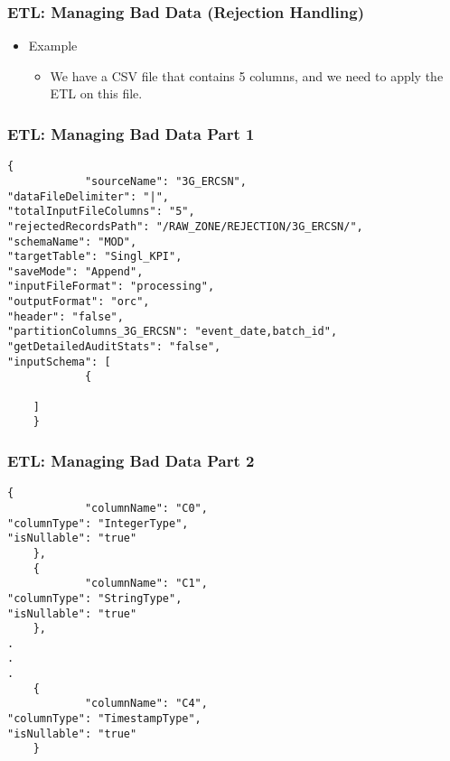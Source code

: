 \begin{frame}[fragile]
	\frametitle{ETL: Managing Bad Data (Rejection Handling)}

	\begin{itemize}[<+->]
		\item Example
		\begin{itemize}[<+->]
			\item  We have a CSV file that contains 5 columns, and we need to apply the ETL on this file.
		\end{itemize}
	\end{itemize}



\end{frame}
\begin{frame}[fragile]
	\frametitle{ETL: Managing Bad Data Part 1}

	\begin{lstlisting}[style=json]
	{
			"sourceName": "3G_ERCSN",
"dataFileDelimiter": "|",
"totalInputFileColumns": "5",
"rejectedRecordsPath": "/RAW_ZONE/REJECTION/3G_ERCSN/",
"schemaName": "MOD",
"targetTable": "Singl_KPI",
"saveMode": "Append",
"inputFileFormat": "processing",
"outputFormat": "orc",
"header": "false",
"partitionColumns_3G_ERCSN": "event_date,batch_id",
"getDetailedAuditStats": "false",
"inputSchema": [
			{

	]
	}
	\end{lstlisting}

\end{frame}
\begin{frame}[fragile]
	\frametitle{ETL: Managing Bad Data Part 2}

	\begin{lstlisting}[style=json,basicstyle=\scriptsize ]
	{
			"columnName": "C0",
"columnType": "IntegerType",
"isNullable": "true"
	},
	{
			"columnName": "C1",
"columnType": "StringType",
"isNullable": "true"
	},
.
.
.
	{
			"columnName": "C4",
"columnType": "TimestampType",
"isNullable": "true"
	}
	\end{lstlisting}

\end{frame}


